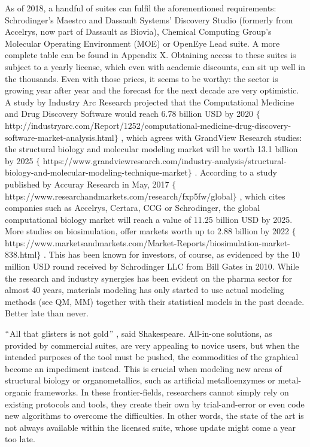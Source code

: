 As of 2018, a handful of suites can fulfil the aforementioned requirements: Schrodinger’s Maestro and Dassault Systems’ Discovery Studio (formerly from Accelrys, now part of Dassault as Biovia), Chemical Computing Group’s Molecular Operating Environment (MOE) or OpenEye Lead suite. A more complete table can be found in Appendix X. Obtaining access to these suites is subject to a yearly license, which even with academic discounts, can sit up well in the thousands. Even with those prices, it seems to be worthy: the sector is growing year after year and the forecast for the next decade are very optimistic. A study by Industry Arc Research projected that the Computational Medicine and Drug Discovery Software would reach 6.78 billion USD by 2020 $ \{ $ http://industryarc.com/Report/1252/computational-medicine-drug-discovery-software-market-analysis.html$ \} $ , which agrees with GrandView Research studies: the structural biology and molecular modeling market will be worth 13.1 billion by 2025 $ \{ $ https://www.grandviewresearch.com/industry-analysis/structural-biology-and-molecular-modeling-technique-market$ \} $ . According to a study published by Accuray Research in May, 2017 $ \{ $ https://www.researchandmarkets.com/research/fxp5fw/global$ \} $ , which cites companies such as Accelrys, Certara, CCG or Schrodinger, the global computational biology market will reach a value of 11.25 billion USD by 2025. More studies on biosimulation, offer markets worth up to 2.88 billion by 2022 $ \{ $ https://www.marketsandmarkets.com/Market-Reports/biosimulation-market-838.html$ \} $ . This has been known for investors, of course, as evidenced by the 10 million USD round received by Schrodinger LLC from Bill Gates in 2010. While the research and industry synergies has been evident on the pharma sector for almost 40 years, materials modeling has only started to use actual modeling methods (see QM, MM) together with their statistical models in the past decade.\cite{hpc2020} Better late than never.


$``$All that glisters is not gold$"$ , said Shakespeare. All-in-one solutions, as provided by commercial suites, are very appealing to novice users, but when the intended purposes of the tool must be pushed, the commodities of the graphical become an impediment instead. This is crucial when modeling new areas of structural biology or organometallics, such as artificial metalloenzymes or metal-organic frameworks. In these frontier-fields, researchers cannot simply rely on existing protocols and tools, they create their own by trial-and-error or even code new algorithms to overcome the difficulties. In other words, the state of the art is not always available within the licensed suite, whose update might come a year too late.

